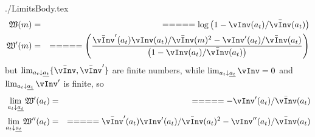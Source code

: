 \newcommand{\textname}{./Appendices/Limits}\documentclass{\econtex} \newcommand{\Mma}{{\it Mathematica}}
\begin{document}
 \large 
\begin{verbatimwrite}{./LimitsBody.tex}
\newcommand{\vPF}{\bar{\vInv}}
\newcommand{\cPF}{\bar{\cFunc}}
\newcommand{\W}{\mathfrak{W}}
\newcommand{\at}{a_{t}}
\newcommand{\atDown}{\lim_{\at \downarrow \underline{\at}}}
  \begin{equation}\begin{gathered}\begin{aligned}
    \W(m)      & = &  =  =  =  =  = \log \left(1-\vInv(\at)/\vPF(\at)\right) 
\\ \W^{\prime}(m)      & = &  =  =  =  =  = \left(\frac{\vPF^{\prime}(\at)\vInv(\at)/\vPF(m)^2-\vInv^{\prime}(\at)/\vPF(\at)}{\left(1-\vInv(\at)/\vPF(\at)\right) }\right)
  \end{aligned}\end{gathered}\end{equation}
but $\atDown \{\vPF,\vPF^{\prime}\}$ are finite numbers, while $\atDown \vInv = 0$ and $\atDown \vInv^{\prime}$ is finite, so
  \begin{equation}\begin{gathered}\begin{aligned}
   \atDown \W^{\prime}(\at)      & = &  =  =  =  =  = -\vInv^{\prime}(\at)/\vPF(\at)
\\ \atDown \W^{\prime\prime}(\at)      & = &  =  =  =  =  = \vPF^{\prime}(\at)\vInv^{\prime}(\at)/\vPF(\at)^{2}-\vInv^{\prime\prime}(\at)/\vPF(\at  )
  \end{aligned}\end{gathered}\end{equation}


\end{verbatimwrite}



\end{document}

